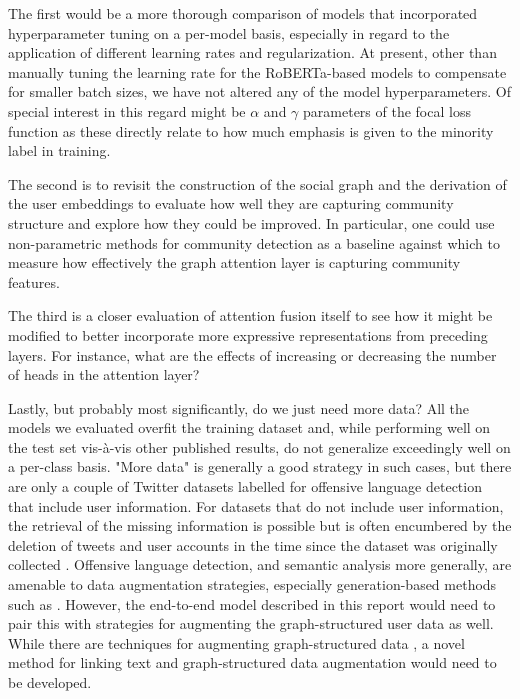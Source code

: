 \documentclass[letterpaper]{article} %
\begin{document}
The first would be a more thorough comparison of models that incorporated hyperparameter tuning on a per-model basis, especially in regard to the application of different learning rates and regularization. At present, other than manually tuning the learning rate for the RoBERTa-based models to compensate for smaller batch sizes, we have not altered any of the model hyperparameters. Of special interest in this regard might be $\alpha$ and $\gamma$ parameters of the focal loss function as these directly relate to how much emphasis is given to the minority label in training. 

The second is to revisit the construction of the social graph and the derivation of the user embeddings to evaluate how well they are capturing community structure and explore how they could be improved. In particular, one could use non-parametric methods for community detection as a baseline against which to measure how effectively the graph attention layer is capturing community features. 

The third is a closer evaluation of attention fusion itself to see how it might be modified to better incorporate more expressive representations from preceding layers. For instance, what are the effects of increasing or decreasing the number of heads in the attention layer?

Lastly, but probably most significantly, do we just need more data? All the models we evaluated overfit the training dataset and, while performing well on the test set vis-\`a-vis other published results, do not generalize exceedingly well on a per-class basis. "More data" is generally a good strategy in such cases, but there are only a couple of Twitter datasets labelled for offensive language detection that include user information. For datasets that do not include user information, the retrieval of the missing information is possible but is often encumbered by the deletion of tweets and user accounts in the time since the dataset was originally collected \citep{Mishra2018}. Offensive language detection, and semantic analysis more generally, are amenable to data augmentation strategies, especially generation-based methods such as \citet{liu2020}. However, the end-to-end model described in this report would need to pair this with strategies for augmenting the graph-structured user data as well. While there are techniques for augmenting graph-structured data \citep{zhao2022}, a novel method for linking text and graph-structured data augmentation would need to be developed.

\appendix


\end{document}
